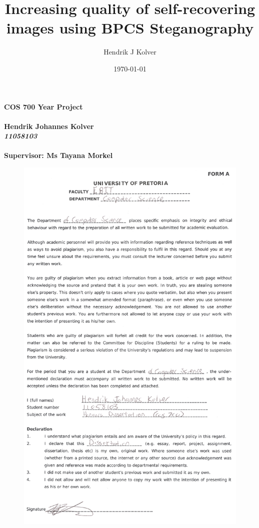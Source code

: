 \documentclass[12pt]{article}
\title{Increasing quality of self-recovering images using BPCS Steganography}
\author{Hendrik J Kolver}
\date{\today}
\begin{document}
\begin{titlepage}
	\begin{center}
		{\Huge \textbf{COS 700 Year Project}}
		\hspace{0pt} \\
		\hspace{0pt} \\
		{\LARGE  \textbf{Hendrik Johannes Kolver}}
		\hspace{0pt} \\
		{\Large \textit{\textbf{11058103}}}
		\hspace{0pt} \\
		\hspace{0pt} \\
		{\LARGE  \textbf{Supervisor: Ms Tayana Morkel}}
	\end{center}
	\begin{figure}[h]
		\centerline{%
		\includegraphics[scale=0.08]{"plag"}%
		}%
	\end{figure}
	
\end{titlepage}
\end{document}
